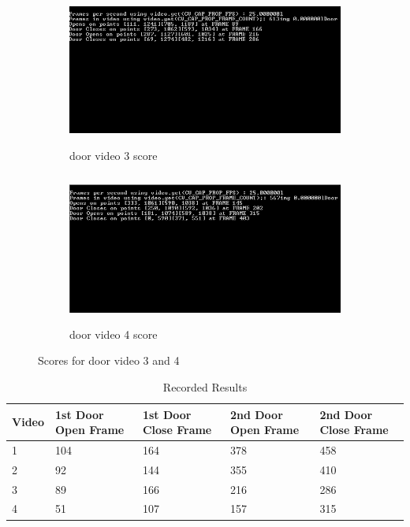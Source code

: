 \documentclass{article}
\begin{document}
\begin{figure}[H]
	\begin{subfigure}{0.5\textwidth}
		\includegraphics[width=1\linewidth, height=5cm]{door3_score.PNG} 
		\caption{door video 3 score}
		\label{fig:subim1}
	\end{subfigure}
	\begin{subfigure}{0.5\textwidth}
		\includegraphics[width=1\linewidth, height=5cm]{Door44_score.PNG}
		\caption{door video 4 score}
		\label{fig:subim2}
	\end{subfigure}
	\caption{Scores for door video 3 and 4}
	\label{fig:image2}
\end{figure}

\begin{table}[H]
	\centering
	\caption{Recorded Results}
	\label{my-label}
	\begin{tabular}{|l|l|l|l|l|}
		\hline
		Video & 1st Door Open Frame & 1st Door Close Frame & 2nd Door Open Frame & 2nd Door Close Frame     \\ \hline
		1                     & 104                  & 164            & 378               & 458 \\ \hline
		2                     & 92                  & 144            & 355             & 410\\ \hline
		3                     & 89                     & 166                    & 216                     & 286 \\ \hline
		4                     & 51                     & 107                    & 157                     & 315 \\ \hline
	\end{tabular}
\end{table}
\end{document}
